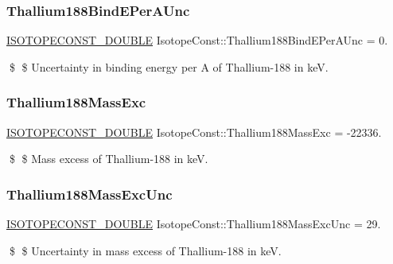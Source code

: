 \subsubsection{\texorpdfstring{Thallium188\+Bind\+E\+Per\+A\+Unc}{Thallium188BindEPerAUnc}}
{\footnotesize\ttfamily \mbox{\hyperlink{group___isotope_const-_macros_ga8f45a7272ce02c0b4c65c44636ed719a}{I\+S\+O\+T\+O\+P\+E\+C\+O\+N\+S\+T\+\_\+\+D\+O\+U\+B\+LE}} Isotope\+Const\+::\+Thallium188\+Bind\+E\+Per\+A\+Unc = 0.}

\$ \$ Uncertainty in binding energy per A of Thallium-\/188 in keV. \mbox{\label{group___isotope_const-_thallium-_tl188_gaa3fc9333ba174d63b9eacec1622aaed8}} 
\subsubsection{\texorpdfstring{Thallium188\+Mass\+Exc}{Thallium188MassExc}}
{\footnotesize\ttfamily \mbox{\hyperlink{group___isotope_const-_macros_ga8f45a7272ce02c0b4c65c44636ed719a}{I\+S\+O\+T\+O\+P\+E\+C\+O\+N\+S\+T\+\_\+\+D\+O\+U\+B\+LE}} Isotope\+Const\+::\+Thallium188\+Mass\+Exc = -\/22336.}

\$ \$ Mass excess of Thallium-\/188 in keV. \mbox{\label{group___isotope_const-_thallium-_tl188_gab862d7606c0f14f8b087a8621fc9ee4e}} 
\subsubsection{\texorpdfstring{Thallium188\+Mass\+Exc\+Unc}{Thallium188MassExcUnc}}
{\footnotesize\ttfamily \mbox{\hyperlink{group___isotope_const-_macros_ga8f45a7272ce02c0b4c65c44636ed719a}{I\+S\+O\+T\+O\+P\+E\+C\+O\+N\+S\+T\+\_\+\+D\+O\+U\+B\+LE}} Isotope\+Const\+::\+Thallium188\+Mass\+Exc\+Unc = 29.}

\$ \$ Uncertainty in mass excess of Thallium-\/188 in keV. \mbox{\label{group___isotope_const-_thallium-_tl188_gac111e408985a93ae231bbe8ef6be451f}} 
